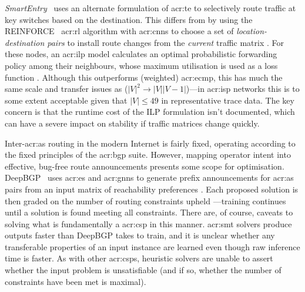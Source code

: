 \emph{SmartEntry}\littrace~\parencite{DBLP:conf/sigcomm/00010YC20} uses an alternate formulation of \gls{acr:te} to selectively route traffic at key switches based on the destination.
This differs from \citeauthor{DBLP:conf/hotnets/ValadarskySST17} by using the REINFORCE~\parencite{DBLP:journals/ml/Williams92} \gls{acr:rl} algorithm with \glspl{acr:cnn} to choose a set of \emph{location-destination pairs} to install route changes \prllitact{} from the \emph{current} traffic matrix \prllitstate.
For these nodes, an \gls{acr:ilp} model calculates an optimal probabilistic forwarding policy among their neighbours, whose maximum utilisation is used as a loss function \prllitreward.
Although this outperforms (weighted) \gls{acr:ecmp}, this has much the same scale and transfer issues as \citeauthor{DBLP:conf/hotnets/ValadarskySST17} ($|V|^2\rightarrow|V||V-1|$)---in \gls{acr:isp} networks this is to some extent acceptable given that $|V|\leq49$ in representative trace data.
The key concern is that the runtime cost of the ILP formulation isn't documented, which can have a severe impact on stability if traffic matrices change quickly.

Inter-\gls{acr:as} routing in the modern Internet is fairly fixed, operating according to the fixed principles of the \gls{acr:bgp} suite.
However, mapping operator intent into effective, bug-free route announcements presents some scope for optimisation.
DeepBGP~\parencite{DBLP:conf/sigcomm/BahnasyLXC20} uses \gls{acr:es} and \glspl{acr:gnn} to generate prefix announcements for \gls{acr:as} pairs \prllitact{} from an input matrix of reachability preferences \prllitstate{}.
Each proposed solution is then graded on the number of routing constraints upheld \prllitreward{}---training continues until a solution is found meeting all constraints.
There are, of course, caveats to solving what is fundamentally a \gls{acr:csp} in this manner.
\gls{acr:smt} solvers produce outputs faster than DeepBGP takes to train, and it is unclear whether any transferable properties of an input instance are learned even though raw inference time is faster.
As with other \glspl{acr:csp}, heuristic solvers are unable to assert whether the input problem is unsatisfiable (and if so, whether the number of constraints have been met is maximal).

